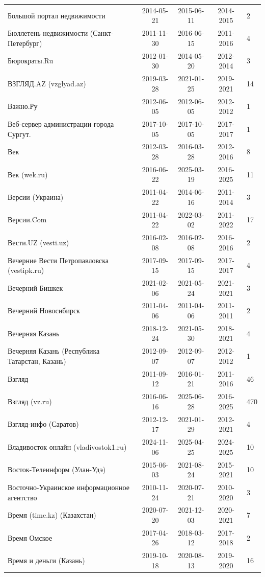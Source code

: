 \begin{longtable}{p{6cm}cccp{2cm}}
Большой портал недвижимости & 2014-05-21 & 2015-06-11 & 2014-2015 & 2\\
Бюллетень недвижимости (Санкт-Петербург) & 2011-11-30 & 2016-06-15 & 2011-2016 & 4\\
Бюрократы.Ru & 2012-01-30 & 2014-05-20 & 2012-2014 & 3\\
ВЗГЛЯД.AZ (vzglyad.az) & 2019-03-28 & 2021-01-25 & 2019-2021 & 14\\
Важно.Ру & 2012-06-05 & 2012-06-05 & 2012-2012 & 1\\
Веб-сервер администрации города Сургут. & 2017-10-05 & 2017-10-05 & 2017-2017 & 1\\
Век & 2012-03-28 & 2016-03-28 & 2012-2016 & 8\\
Век (wek.ru) & 2016-06-22 & 2025-03-19 & 2016-2025 & 11\\
Версии (Украина) & 2011-04-22 & 2014-06-16 & 2011-2014 & 3\\
Версии.Com & 2011-04-22 & 2022-03-02 & 2011-2022 & 17\\
Вести.UZ (vesti.uz) & 2016-02-08 & 2016-02-08 & 2016-2016 & 2\\
Вечерние Вести Петропавловска (vestipk.ru) & 2017-09-15 & 2017-09-15 & 2017-2017 & 4\\
Вечерний Бишкек & 2021-02-06 & 2021-05-24 & 2021-2021 & 3\\
Вечерний Новосибирск & 2011-04-06 & 2011-04-06 & 2011-2011 & 2\\
Вечерняя Казань & 2018-12-24 & 2021-05-30 & 2018-2021 & 4\\
Вечерняя Казань (Республика Татарстан, Казань) & 2012-09-07 & 2012-09-07 & 2012-2012 & 1\\
Взгляд & 2011-09-12 & 2016-01-21 & 2011-2016 & 46\\
Взгляд (vz.ru) & 2016-06-16 & 2025-06-28 & 2016-2025 & 470\\
Взгляд-инфо (Саратов) & 2012-12-17 & 2021-01-29 & 2012-2021 & 4\\
Владивосток онлайн (vladivostok1.ru) & 2024-11-06 & 2025-04-25 & 2024-2025 & 10\\
Восток-Телеинформ (Улан-Удэ) & 2015-06-03 & 2021-08-24 & 2015-2021 & 10\\
Восточно-Украинское информационное агентство & 2010-11-24 & 2020-07-21 & 2010-2020 & 3\\
Время (time.kz) (Казахстан) & 2020-07-20 & 2021-12-03 & 2020-2021 & 7\\
Время Омское & 2017-04-26 & 2018-03-12 & 2017-2018 & 2\\
Время и деньги (Казань) & 2019-10-18 & 2020-08-13 & 2019-2020 & 16\\

\end{longtable}
